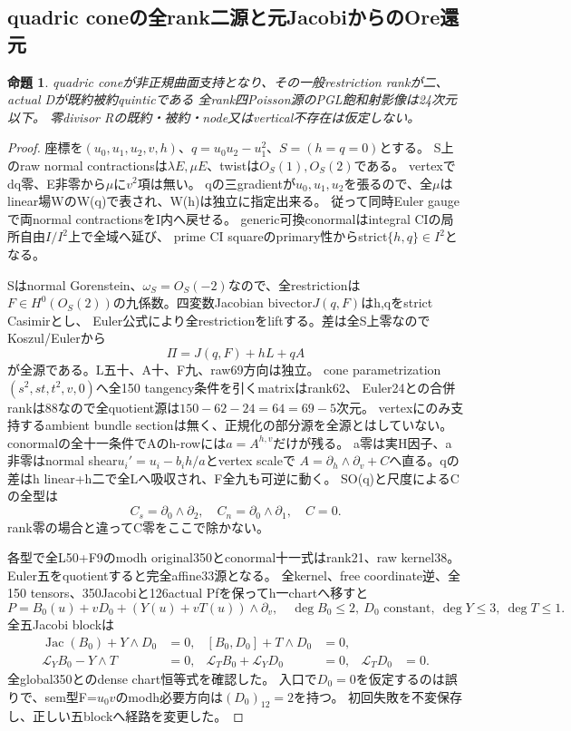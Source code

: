 \documentclass[a4paper,11pt]{ltjsarticle}
\newtheorem{proposition}{命題}[section]
\theoremstyle{definition}
\begin{document}
\subsection{quadric coneの全rank二源と元JacobiからのOre還元}
\begin{proposition}\label{prop:quadric-cone-ranktwo-G}
quadric coneが非正規曲面支持となり、その一般restriction rankが二、actual Dが既約被約quinticである
全rank四Poisson源のPGL飽和射影像は24次元以下。
零divisor Rの既約・被約・node又はvertical不存在は仮定しない。
\end{proposition}
\begin{proof}
座標を$(u_0,u_1,u_2,v,h)$、$q=u_0u_2-u_1^2$、$S=(h=q=0)$とする。
S上のraw normal contractionsは$\lambda E,\mu E$、twistは$O_S(1),O_S(2)$である。
vertexでdq零、E非零から$\mu$に$v^2$項は無い。
qの三gradientが$u_0,u_1,u_2$を張るので、全$\mu$はlinear場WのW(q)で表され、W(h)は独立に指定出来る。
従って同時Euler gaugeで両normal contractionsをI内へ戻せる。
generic可換conormalはintegral CIの局所自由$I/I^2$上で全域へ延び、
prime CI squareのprimary性からstrict$\{h,q\}\in I^2$となる。

Sはnormal Gorenstein、$\omega_S=O_S(-2)$なので、全restrictionは
$F\in H^0(O_S(2))$の九係数。四変数Jacobian bivector$J(q,F)$はh,qをstrict Casimirとし、
Euler公式により全restrictionをliftする。差は全S上零なのでKoszul/Eulerから
\[
 \Pi=J(q,F)+hL+qA
\]
が全源である。L五十、A十、F九、raw69方向は独立。
cone parametrization$(s^2,st,t^2,v,0)$へ全150 tangency条件を引くmatrixはrank62、
Euler24との合併rankは88なので全quotient源は$150-62-24=64=69-5$次元。
vertexにのみ支持するambient bundle sectionは無く、正規化の部分源を全源とはしていない。
conormalの全十一条件でAのh-rowには$a=A^{h,v}$だけが残る。
a零は実H因子、a非零はnormal shear$u_i'=u_i-b_ih/a$とvertex scaleで
$A=\partial_h\wedge\partial_v+C$へ直る。qの差はh linear+h二で全Lへ吸収され、F全九も可逆に動く。
SO(q)と尺度によるCの全型は
\[
 C_s=\partial_0\wedge\partial_2,\quad C_n=\partial_0\wedge\partial_1,\quad C=0.
\]
rank零の場合と違ってC零をここで除かない。

各型で全L50+F9のmodh original350とconormal十一式はrank21、raw kernel38。
Euler五をquotientすると完全affine33源となる。
全kernel、free coordinate逆、全150 tensors、350Jacobiと126actual Pfを保ってh一chartへ移すと
\[
 P=B_0(u)+vD_0+(Y(u)+vT(u))\wedge\partial_v,
 \quad\deg B_0\le2,\ D_0\text{ constant},\ \deg Y\le3,\ \deg T\le1.
\]
全五Jacobi blockは
\[
\begin{aligned}
 \operatorname{Jac}(B_0)+Y\wedge D_0&=0,&[B_0,D_0]+T\wedge D_0&=0,\\
 \mathcal L_YB_0-Y\wedge T&=0,&\mathcal L_TB_0+\mathcal L_YD_0&=0,&\mathcal L_TD_0&=0.
\end{aligned}
\]
全global350とのdense chart恒等式を確認した。
入口で$D_0=0$を仮定するのは誤りで、sem型F=$u_0v$のmodh必要方向は$(D_0)_{12}=2$を持つ。
初回失敗を不変保存し、正しい五blockへ経路を変更した。


\end{proof}
\end{document}
